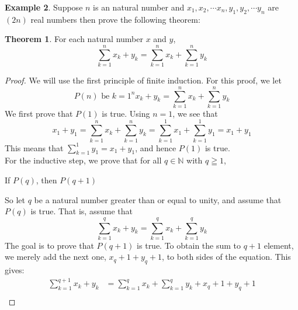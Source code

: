 \documentclass{book}
\theoremstyle{definition}
\newtheorem{theorem}{Theorem}[section]
\newtheorem{example}[theorem]{Example}
\begin{document}
\newpage
\begin{example}
Suppose $n$ is an natural number and $x_1, x_2, \cdots x_n, y_1, y_2, \cdots y_n$ are $(2n)$ real numbers then prove the following theorem:
    
    \begin{tcolorbox}
        \begin{theorem}
            For each natural number $x$ and $y$,
                \begin{equation*}
                    \sum_{k=1}^{n}{x_k + y_k} = \sum_{k=1}^{n}{x_k} + \sum_{k=1}^{n}{y_k}                
                \end{equation*}
        \end{theorem}
    \end{tcolorbox}

    \begin{proof}
        We will use the first principle of finite induction. For this proof, we let
            \begin{equation*}
                P(n) \text{ be } {k=1}^{n}{x_k + y_k} = \sum_{k=1}^{n}{x_k} + \sum_{k=1}^{n}{y_k} 
            \end{equation*}
        We first prove that $P(1)$ is true. Using $n=1$, we see that
            \begin{equation*}
                x_1 + y_1 = \sum_{k=1}^{n}{x_k} + \sum_{k=1}^{n}{y_k}  = \sum_{k=1}^{1}{x_1} + \sum_{k=1}^{1}{y_1}  = x_1 + y_1
            \end{equation*}
        This means that $\sum_{k=1}^{1}{y_1}  = x_1 + y_1$, and hence $P(1)$ is true. \\
        For the inductive step, we prove that for all $q \in \mathbb{N}$ with $q \geqq 1$, 
            \begin{center}
                If $P(q)$, then $P(q+1)$
            \end{center}
        So let $q$ be a natural number greater than or equal to unity, and assume that $P(q)$ is true. That is, assume that 
            \begin{equation*}
               \sum_{k=1}^{q}{x_k + y_k} = \sum_{k=1}^{q}{x_k} + \sum_{k=1}^{q}{y_k}
            \end{equation*}
        The goal is to prove that $P(q+1)$ is true. To obtain the sum to $q+1$ element, we merely add the next one, $x_q+1 + y_q+1$, to both sides of the equation. This gives: 
            \begin{align*}
                \sum_{k=1}^{q+1}{x_k + y_k} & = \sum_{k=1}^{q}{x_k} + \sum_{k=1}^{q}{y_k} + x_q+1 + y_q+1 \\

\end{align*}
\end{proof}
\end{example}
\end{document}
